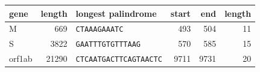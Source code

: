 \begin{tabular}{lrlrrr}
\hline
gene & length & longest palindrome & start & end & length \\
\hline
M & 669 & \texttt{CTAAAGAAATC} & 493 & 504 & 11 \\
S & 3822 & \texttt{GAATTTGTGTTTAAG} & 570 & 585 & 15 \\
orf1ab & 21290 & \texttt{CTCAATGACTTCAGTAACTC} & 9711 & 9731 & 20 \\
\hline
\end{tabular}